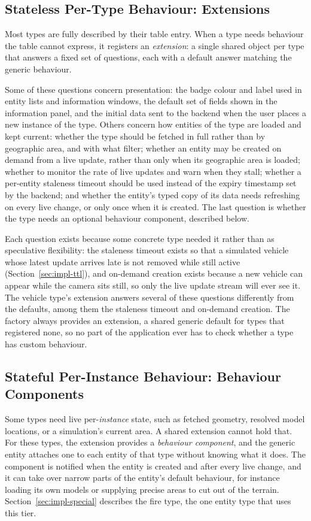 \subsection{Stateless Per-Type Behaviour: Extensions}

Most types are fully described by their table entry. When a type needs behaviour the table cannot express, it registers an \emph{extension}: a single shared object per type that answers a fixed set of questions, each with a default answer matching the generic behaviour.

Some of these questions concern presentation: the badge colour and label used in entity lists and information windows, the default set of fields shown in the information panel, and the initial data sent to the backend when the user places a new instance of the type. Others concern how entities of the type are loaded and kept current: whether the type should be fetched in full rather than by geographic area, and with what filter; whether an entity may be created on demand from a live update, rather than only when its geographic area is loaded; whether to monitor the rate of live updates and warn when they stall; whether a per-entity staleness timeout should be used instead of the expiry timestamp set by the backend; and whether the entity's typed copy of its data needs refreshing on every live change, or only once when it is created. The last question is whether the type needs an optional behaviour component, described below.

Each question exists because some concrete type needed it rather than as speculative flexibility: the staleness timeout exists so that a simulated vehicle whose latest update arrives late is not removed while still active (Section~\ref{sec:impl-ttl}), and on-demand creation exists because a new vehicle can appear while the camera sits still, so only the live update stream will ever see it. The vehicle type's extension answers several of these questions differently from the defaults, among them the staleness timeout and on-demand creation. The factory always provides an extension, a shared generic default for types that registered none, so no part of the application ever has to check whether a type has custom behaviour.

\subsection{Stateful Per-Instance Behaviour: Behaviour Components}

Some types need live per-\emph{instance} state, such as fetched geometry, resolved model locations, or a simulation's current area. A shared extension cannot hold that. For these types, the extension provides a \emph{behaviour component}, and the generic entity attaches one to each entity of that type without knowing what it does. The component is notified when the entity is created and after every live change, and it can take over narrow parts of the entity's default behaviour, for instance loading its own models or supplying precise areas to cut out of the terrain. Section~\ref{sec:impl-special} describes the fire type, the one entity type that uses this tier.

